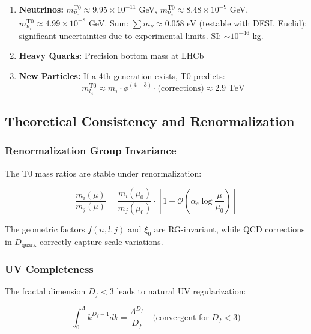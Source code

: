 	\begin{enumerate}
		\item \textbf{Neutrinos:} $m_{\nu_e}^{\text{T0}} \approx 9.95 \times 10^{-11}$ GeV, $m_{\nu_\mu}^{\text{T0}} \approx 8.48 \times 10^{-9}$ GeV, $m_{\nu_\tau}^{\text{T0}} \approx 4.99 \times 10^{-8}$ GeV. Sum: $\sum m_\nu \approx 0.058$ eV (testable with DESI, Euclid); significant uncertainties due to experimental limits. SI: $\sim 10^{-46}$ kg.
		
		\item \textbf{Heavy Quarks:} Precision bottom mass at LHCb
		
		\item \textbf{New Particles:} If a 4th generation exists, T0 predicts:
		\begin{equation}
			m_{l_4}^{\text{T0}} \approx m_\tau \cdot \phi^{(4-3)} \cdot \text{(corrections)} \approx 2.9 \text{ TeV}
		\end{equation}
	\end{enumerate}
	
	\subsection{Theoretical Consistency and Renormalization}
	
	\subsubsection{Renormalization Group Invariance}
	
	The T0 mass ratios are stable under renormalization:
	
	\begin{equation}
		\frac{m_i(\mu)}{m_j(\mu)} = \frac{m_i(\mu_0)}{m_j(\mu_0)} \cdot \left[1 + \mathcal{O}\left(\alpha_s \log\frac{\mu}{\mu_0}\right)\right]
	\end{equation}
	
	The geometric factors $f(n,l,j)$ and $\xi_0$ are RG-invariant, while QCD corrections in $D_{\text{quark}}$ correctly capture scale variations.
	
	\subsubsection{UV Completeness}
	
	The fractal dimension $D_f < 3$ leads to natural UV regularization:
	
	\begin{equation}
		\int_0^\Lambda k^{D_f-1} dk = \frac{\Lambda^{D_f}}{D_f} \quad \text{(convergent for } D_f < 3\text{)}
	\end{equation}
	

